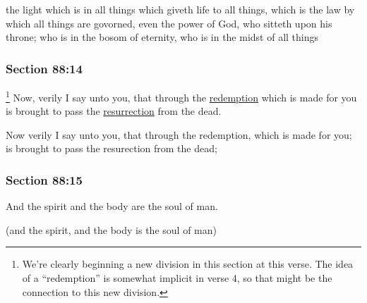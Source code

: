 		\begin{framed}
		\scriptsize
			\begin{compactdesc}
				\item[JSP] the light which is in all things which giveth life to all things, which is the law by which all things are govorned, even the power of God, who sitteth upon his throne; who is in the bosom of eternity, who is in the midst of all things
			\end{compactdesc}
		\end{framed}

	\subsubsection{Section 88:14} %
		\label{DC88-14}

			\footnote{%
				We're clearly beginning a new division in this section at this verse. The idea of a ``redemption'' is somewhat implicit in verse 4, so that might be the connection to this new division.
				}%
		Now, verily I say unto you, that through the \hyperref[REDEMPTION]{redemption} which is made for you is brought to pass the \hyperref[RESURRECTION]{resurrection} from the dead.

		\begin{framed}
		\scriptsize
			\begin{compactdesc}
				\item[JSP] Now verily I say unto you, that through the redemption, which is made for you; is brought to pass the resurection from the dead;
			\end{compactdesc}
		\end{framed}

	\subsubsection{Section 88:15} %
		\label{DC88-15}

		And the spirit and the body are the soul of man.

		\begin{framed}
		\scriptsize
			\begin{compactdesc}
				\item[JSP] (and the spirit, and the body is the soul of man)
			\end{compactdesc}
		\end{framed}


